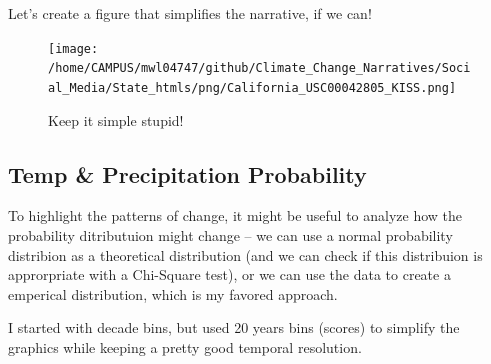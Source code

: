 \documentclass{article}
\begin{document}
Let's create a figure that simplifies the narrative, if we can!

\begin{knitrout}
\color{fgcolor}\begin{kframe}


{\ttfamily\noindent\bfseries\color{errorcolor}{\#\# Error in seq(min(GSOM\$Year), max(GSOM\$Year), by = 2): object 'GSOM' not found}}\end{kframe}
\end{knitrout}

\begin{figure}
\texttt{[image: /home/CAMPUS/mwl04747/github/Climate\_Change\_Narratives/Social\_Media/State\_htmls/png/California\_USC00042805\_KISS.png]}
\caption{Keep it simple stupid!}
\label{fig:GSOM-KISS}
\end{figure}

\subsection{Temp \& Precipitation Probability}

To highlight the patterns of change, it might be useful to analyze how the probability ditributuion might change -- we can use a normal probability distribion as a theoretical distribution (and we can check if this distribuion is approrpriate with a Chi-Square test), or we can use the data to create a emperical distribution, which is my favored approach. 

I started with decade bins, but used 20 years bins (scores) to simplify the graphics while keeping a pretty good temporal resolution.
\end{document}
